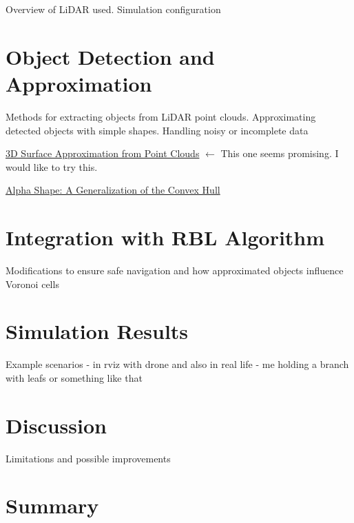 Overview of LiDAR used. Simulation configuration

\section{Object Detection and Approximation}

Methods for extracting objects from LiDAR point clouds. Approximating detected objects with simple shapes. Handling noisy or incomplete data


\href{https://groups.inf.ed.ac.uk/advr/papers/3D_Surface_Approximation_from_Point_Clouds.pdf}{3D Surface Approximation from Point Clouds} $\leftarrow$ This one seems promising. I would like to try this.


\href{https://en.wikipedia.org/wiki/Alpha_shape}{Alpha Shape: A Generalization of the Convex Hull}



\section{Integration with RBL Algorithm}

Modifications to ensure safe navigation and how approximated objects influence Voronoi cells

\section{Simulation Results}

Example scenarios - in rviz with drone and also in real life - me holding a branch with leafs or something like that

\section{Discussion}

Limitations and possible improvements

\section{Summary}